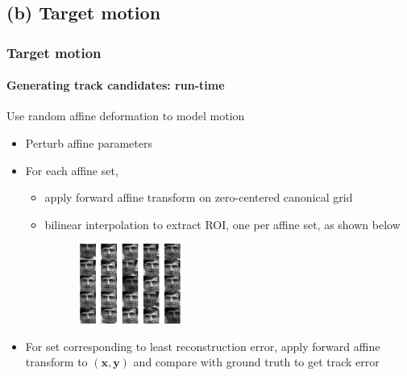 \subsection{(b) Target motion}
\begin{frame}
\frametitle{Target motion}
\framesubtitle{Generating track candidates: run-time}
\logoCSIPCPL\mypagenum
Use random affine deformation to model motion
\begin{itemize}
\item Perturb affine parameters
\item For each affine set, 
\begin{itemize}
\item apply forward affine transform on zero-centered canonical grid 
\item bilinear interpolation to extract ROI, one per affine set, as shown below
\begin{figure}[t]
\centering
\includegraphics[width=0.35\textwidth]{thesis/affineCandidates.pdf}
\label{Fig:affine_candidates}
\end{figure}
\end{itemize}
\item For set corresponding to least reconstruction error, apply forward affine transform to $(\mathbf{x, y})$ and compare with ground truth to get track error
\end{itemize}
\end{frame}








